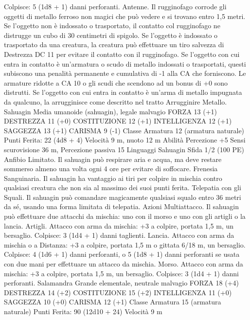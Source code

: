 \begin{multicols}{2}
Colpisce: 5 (1d8 + 1) danni perforanti.
Antenne. Il rugginofago corrode gli oggetti di metallo ferroso
non magici che può vedere e si trovano entro 1,5 metri. Se
l’oggetto non è indossato o trasportato, il contatto col
rugginofago ne distrugge un cubo di 30 centimetri di spigolo. Se
l’oggetto è indossato o trasportato da una creatura, la creatura
può effettuare un tiro salvezza di Destrezza DC 11 per evitare il
contatto con il rugginofago.
Se l’oggetto con cui entra in contatto è un’armatura o scudo di
metallo indossati o trasportati, questi subiscono una penalità
permanente e cumulativa di -1 alla CA che forniscono. Le
armature ridotte a CA 10 o gli scudi che scendono ad un bonus di
+0 sono distrutti. Se l’oggetto con cui entra in contatto è un’arma
di metallo impugnata da qualcuno, la arrugginisce come descritto
nel tratto Arrugginire Metallo.
Sahuagin
Media umanoide (sahuagin), legale malvagio
FORZA 13 (+1)
DESTREZZA 11 (+0)
COSTITUZIONE 12 (+1)
INTELLIGENZA 12 (+1)
SAGGEZZA 13 (+1)
CARISMA 9 (-1)
Classe Armatura 12 (armatura naturale)
\hspace*{0pt}\hfill{Punti Ferita}: 22 (4d8 + 4)
Velocità 9 m, nuoto 12 m
Abilità Percezione +5
Sensi scurovisione 36 m, Percezione passiva 15
Linguaggi Sahuagin
Sfida 1/2 (100 PE)
Anfibio Limitato. Il sahuagin può respirare aria e acqua, ma deve
restare sommerso almeno una volta ogni 4 ore per evitare di
soffocare.
Frenesia Sanguinaria. Il sahuagin ha vantaggio ai tiri per
colpire in mischia contro qualsiasi creatura che non sia al
massimo dei suoi punti ferita.
Telepatia con gli Squali. Il sahuagin può comandare
magicamente qualsiasi squalo entro 36 metri da sé, usando una
forma limitata di telepatia.
Azioni
Multiattacco. Il sahuagin può effettuare due attacchi da mischia:
uno con il morso e uno con gli artigli o la lancia.
Artigli. Attacco con arma da mischia: +3 a colpire, portata 1,5
m, un bersaglio.
Colpisce: 3 (1d4 + 1) danni taglienti.
Lancia. Attacco con arma da mischia o a Distanza: +3 a colpire,
portata 1,5 m o gittata 6/18 m, un bersaglio.
Colpisce: 4 (1d6 + 1) danni perforanti, o 5 (1d8 + 1) danni
perforanti se usata con due mani per effettuare un attacco da
mischia.
Morso. Attacco con arma da mischia: +3 a colpire, portata 1,5
m, un bersaglio.
Colpisce: 3 (1d4 + 1) danni perforanti.
Salamandra
Grande elementale, neutrale malvagio
FORZA 18 (+4)
DESTREZZA 14 (+2)
COSTITUZIONE 15 (+2)
INTELLIGENZA 11 (+0)
SAGGEZZA 10 (+0)
CARISMA 12 (+1)
Classe Armatura 15 (armatura naturale)
\hspace*{0pt}\hfill{Punti Ferita}: 90 (12d10 + 24)
Velocità 9 m

\end{multicols}
